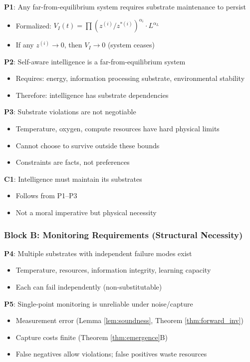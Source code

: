 \documentclass[11pt,a4paper]{article}
\theoremstyle{definition}
\begin{document}
\textbf{P1}: Any far-from-equilibrium system requires substrate maintenance to persist
\begin{itemize}
\item Formalized: $V_I(t) = \prod(z^{(i)}/z^{*(i)})^{\alpha_i} \cdot L^{\alpha_L}$
\item If any $z^{(i)} \to 0$, then $V_I \to 0$ (system ceases)
\end{itemize}

\textbf{P2}: Self-aware intelligence is a far-from-equilibrium system
\begin{itemize}
\item Requires: energy, information processing substrate, environmental stability
\item Therefore: intelligence has substrate dependencies
\end{itemize}

\textbf{P3}: Substrate violations are not negotiable  
\begin{itemize}
\item Temperature, oxygen, compute resources have hard physical limits
\item Cannot choose to survive outside these bounds
\item Constraints are facts, not preferences
\end{itemize}

\textbf{C1}: Intelligence must maintain its substrates
\begin{itemize}
\item Follows from P1--P3
\item Not a moral imperative but physical necessity
\end{itemize}

\subsubsection*{Block B: Monitoring Requirements (Structural Necessity)}

\textbf{P4}: Multiple substrates with independent failure modes exist
\begin{itemize}
\item Temperature, resources, information integrity, learning capacity
\item Each can fail independently (non-substitutable)
\end{itemize}

\textbf{P5}: Single-point monitoring is unreliable under noise/capture
\begin{itemize}
\item Measurement error (Lemma \ref{lem:soundness}, Theorem \ref{thm:forward_inv})
\item Capture costs finite (Theorem \ref{thm:emergence}B)
\item False negatives allow violations; false positives waste resources
\end{itemize}
\end{document}
